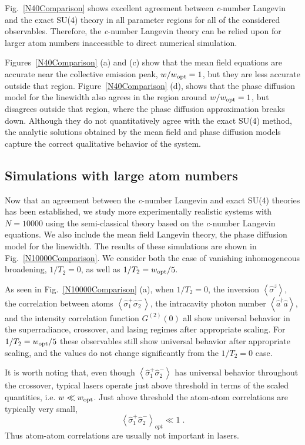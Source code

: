 \documentclass[aps,
twocolumn,
showpacs,
superscriptaddress,groupedaddress]{revtex4}
\begin{document}
Fig.~\ref{N40Comparison} shows excellent agreement between {\it
c}-number Langevin and the exact SU(4) theory in all parameter regions
for all of the considered observables. Therefore, the {\it c}-number
Langevin theory can be relied upon for larger atom numbers inaccessible
to direct numerical simulation.

Figures~\ref{N40Comparison} (a) and (c) show that the mean field
equations are accurate near the collective emission peak, $w/w_{\rm opt}=1$,
but they are less accurate outside that region.
Figure~\ref{N40Comparison} (d), shows that the phase diffusion model for
the linewidth also agrees in the region around $w/w_{\rm opt}=1$, but
disagrees outside that region, where the phase diffusion approximation
breaks down.  Although they do not quantitatively agree with the exact
SU(4) method, the analytic solutions obtained by the mean field and
phase diffusion models capture the correct qualitative behavior of the
system.


\subsection{Simulations with large atom numbers}

Now that an agreement between the {\it c}-number Langevin and exact
SU(4) theories has been established, we study more experimentally
realistic systems with $N=10000$ using the semi-classical theory based
on the {\it c}-number Langevin equations. We also include the mean field
Langevin theory, the phase diffusion model for the linewidth. The
results of these simulations are shown in Fig.~\ref{N10000Comparison}.
We consider both the case of vanishing inhomogeneous broadening,
$1/T_2=0$, as well as $1/T_2=w_{\rm opt}/5$.

As seen in Fig.~\ref{N10000Comparison} (a), when $1/T_2=0$, the
inversion $\left<\hat{\sigma}^{z}\right>$, the correlation between atoms
$\left<\hat{\sigma}_{1}^{+} \hat{\sigma}_{2}^{-}\right>$, the
intracavity photon number  $\left<\hat{a}^{\dagger}\hat{a}\right>$,  and
the intensity correlation function $G^{(2)}(0)$ all show universal
behavior in the superradiance, crossover, and lasing regimes after
appropriate scaling.  For $1/T_2=w_{\rm opt}/5$ these observables still show
universal behavior after appropriate scaling, and the values do not
change significantly from the $1/T_2=0$ case.

It is worth noting that, even though  $\left<\hat{\sigma}_{1}^{+}
\hat{\sigma}_{2}^{-}\right>$ has universal behavior throughout the
crossover, typical lasers operate just above threshold in terms of the
scaled quantities, i.e. $w \ll w_{\rm opt}$.  Just above threshold the
atom-atom correlations are typically very small,
\begin{equation}
\left<\hat{\sigma}_{1}^{+}\hat{\sigma}_{2}^{-}\right>_{opt} \ll 1\;.
\end{equation}
Thus atom-atom correlations are usually not important in lasers.
\end{document}
